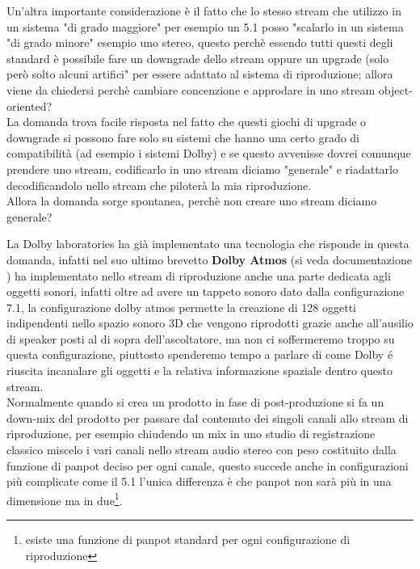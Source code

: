 \documentclass[12pt,a4paper]{report}
\begin{document}
Un'altra importante considerazione è il fatto che lo stesso stream che utilizzo in un sistema "di grado maggiore" per esempio un 5.1 posso "scalarlo in un sistema "di grado minore" esempio uno stereo, questo perchè essendo tutti questi degli standard è possibile fare un downgrade dello stream oppure un upgrade (solo però solto alcuni artifici" per essere adattato al sistema di riproduzione; allora viene da chiedersi perchè cambiare concenzione e approdare in uno stream object-oriented?\\

La domanda trova facile risposta nel fatto che questi giochi di upgrade o downgrade si possono fare solo su sistemi che hanno una certo grado di compatibilità (ad esempio i sistemi Dolby) e se questo avvenisse dovrei comunque prendere uno stream, codificarlo in uno stream diciamo "generale" e riadattarlo decodificandolo nello stream che piloterà la mia riproduzione.\\

Allora la domanda sorge spontanea, perchè non creare uno stream diciamo generale?

La Dolby laboratories ha già implementato una tecnologia che risponde in questa domanda, infatti nel suo ultimo brevetto \textbf{Dolby Atmos} (si veda documentazione \cite{atmos}) ha implementato nello stream di riproduzione anche una parte dedicata agli oggetti sonori, infatti oltre ad avere un tappeto sonoro dato dalla configurazione 7.1, la configurazione dolby atmos permette la creazione di 128 oggetti indipendenti nello spazio sonoro 3D che vengono riprodotti grazie anche all'ausilio di speaker posti al di sopra dell'ascoltatore, ma non ci soffermeremo troppo su questa configurazione, piuttosto spenderemo tempo a parlare di come Dolby é riuscita incanalare gli oggetti e la relativa informazione spaziale dentro questo stream.\\

Normalmente quando si crea un prodotto in fase di post-produzione si fa un down-mix del prodotto per passare dal contenuto dei singoli canali allo stream di riproduzione, per esempio chiudendo un mix in uno studio di registrazione classico miscelo i vari canali nello stream audio stereo con peso costituito dalla funzione di panpot deciso per ogni canale, questo succede anche in configurazioni più complicate come il 5.1 l'unica differenza è che panpot non sarà più in una dimensione ma in due\footnote{esiste una funzione di panpot standard per ogni configurazione di riproduzione}.\\
\end{document}
